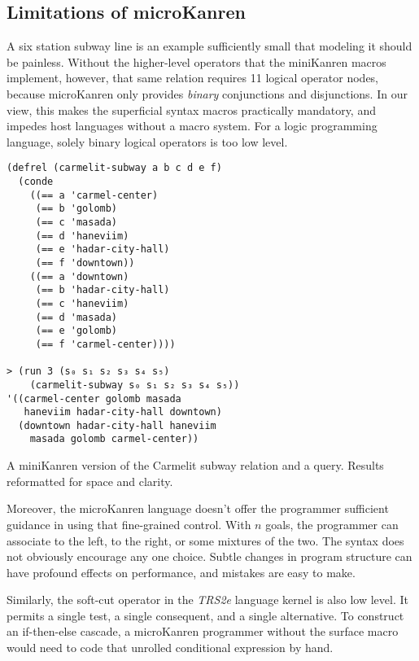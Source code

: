 \documentclass[sigplan,balance=true,pbalance=true,natbib=false]{acmart}
\begin{document}
\subsection{Limitations of microKanren}

A six station subway line is an example sufficiently small that
modeling it should be painless. Without the higher-level operators
that the miniKanren macros implement, however, that same relation
requires 11 logical operator nodes, because microKanren only provides
\emph{binary} conjunctions and disjunctions. In our view, this makes
the superficial syntax macros practically mandatory, and impedes host
languages without a macro system. For a logic programming language,
solely binary logical operators is too low level.

\begin{listing}
  \begin{verbatim}
(defrel (carmelit-subway a b c d e f)
  (conde
    ((== a 'carmel-center)
     (== b 'golomb)
     (== c 'masada)
     (== d 'haneviim)
     (== e 'hadar-city-hall)
     (== f 'downtown))
    ((== a 'downtown)
     (== b 'hadar-city-hall)
     (== c 'haneviim)
     (== d 'masada)
     (== e 'golomb)
     (== f 'carmel-center))))

> (run 3 (s₀ s₁ s₂ s₃ s₄ s₅)
    (carmelit-subway s₀ s₁ s₂ s₃ s₄ s₅))
'((carmel-center golomb masada
   haneviim hadar-city-hall downtown)
  (downtown hadar-city-hall haneviim
    masada golomb carmel-center))
  \end{verbatim}
  \caption{A miniKanren version of the Carmelit subway relation and a query. Results reformatted for space and clarity.}
  \label{mnt:carmelit}
\end{listing}

Moreover, the microKanren language doesn't offer the programmer
sufficient guidance in using that fine-grained control. With $n$
goals, the programmer can associate to the left, to the right, or some
mixtures of the two. The syntax does not obviously encourage any one
choice. Subtle changes in program structure can have profound effects
on performance, and mistakes are easy to make.

Similarly, the soft-cut operator  in the \emph{TRS2e}
language kernel is also low level. It permits a single test, a single
consequent, and a single alternative. To construct an if-then-else
cascade, a microKanren programmer without the 
surface macro would need to code that unrolled conditional expression
by hand.
\end{document}

